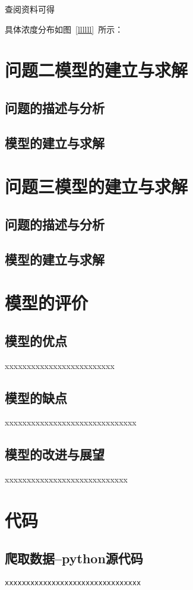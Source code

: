 \documentclass{whutmod}
\begin{document}
	查阅资料可得\parencite{宋鸿2010城市人才吸引力的影响因素及提升对策}
	
具体浓度分布如图~\ref{llllll}~所示：


	\section{问题二模型的建立与求解}
	\subsection{问题的描述与分析}
	\subsection{模型的建立与求解}
	

	\section{问题三模型的建立与求解}
	
	
	\subsection{问题的描述与分析}

	\subsection{模型的建立与求解}


	\section{模型的评价}
	\subsection{模型的优点}
xxxxxxxxxxxxxxxxxxxxxxxxx
	
	\subsection{模型的缺点}
xxxxxxxxxxxxxxxxxxxxxxxxxxxxxx


	\subsection{模型的改进与展望}%
xxxxxxxxxxxxxxxxxxxxxxxxxxxx
	\newpage	%
	\nocite{*}		%
	\printbibliography[title = {参考文献}]	%
	
	\newpage
	\appendix %
\section{代码}
\subsection{爬取数据--python源代码}
\begin{lstlisting}[language=python]%这里修改语言
xxxxxxxxxxxxxxxxxxxxxxxxxxxxxxxx
\end{lstlisting}
\end{document}
